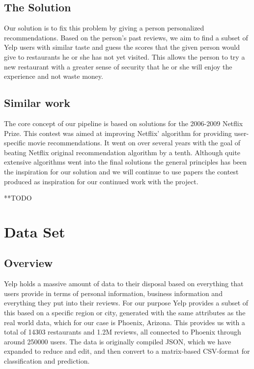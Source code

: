 \documentclass[10pt,twocolumn,letterpaper]{article}
\begin{document}
\subsection{The Solution}
Our solution is to fix this problem by giving a person personalized recommendations. Based on the person's past reviews, we aim to find a subset of Yelp users with similar taste and guess the scores that the given person would give to restaurants he or she has not yet visited. This allows the person to try a new restaurant with a greater sense of security that he or she will enjoy the experience and not waste money.
\subsection{Similar work}
The core concept of our pipeline is based on solutions for the 2006-2009 Netflix Prize. This contest was aimed at improving Netflix' algorithm for providing user-specific movie recommendations. It went on over several years with the goal of beating Netflix original recommendation algorithm by a tenth. Although quite extensive algorithms went into the final solutions the general principles has been the inspiration for our solution and we will continue to use papers the contest produced as inspiration for our continued work with the project\cite{KorBell}\cite{BellKor}.

**TODO


\section{Data Set}

\subsection{Overview}
Yelp holds a massive amount of data to their disposal based on everything that users provide in terms of personal information, business information and everything they put into their reviews. For our purpose Yelp provides a subset of this based on a specific region or city, generated with the same attributes as the real world data, which for our case is Phoenix, Arizona. This provides us with a total of 14303 restaurants and 1.2M reviews, all connected to Phoenix through around 250000 users. The data is originally compiled JSON, which we have expanded to reduce and edit, and then convert to a matrix-based CSV-format for classification and prediction.
\end{document}
